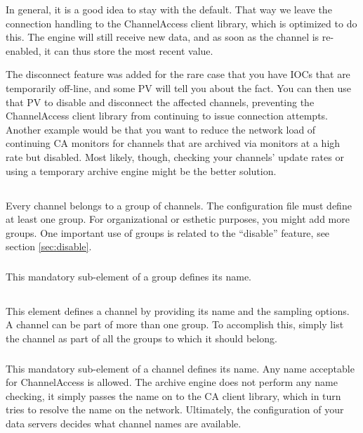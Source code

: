 In general, it is a good idea to stay with the default. That way we
leave the connection handling to the ChannelAccess client library,
which is optimized to do this. The engine will still receive new data,
and as soon as the channel is re-enabled, it can thus store the most
recent value.

The disconnect feature was added for the rare case that you have IOCs
that are temporarily off-line, and some PV will tell you about the
fact. You can then use that PV to disable and disconnect the affected
channels, preventing the ChannelAccess client library from continuing
to issue connection attempts. Another example would be that you want
to reduce the network load of continuing CA monitors for channels
that are archived via monitors at a high rate but disabled. 
Most likely, though, checking your channels' update rates or using a
temporary archive engine might be the better solution.

\subsection{}
Every channel belongs to a group of channels. The configuration file
must define at least one group. For organizational or esthetic
purposes, you might add more groups. One important use of groups is
related to the ``disable'' feature, see section \ref{sec:disable}.

\subsubsection{}
This mandatory sub-element of a group defines its name.

\subsection{}
This element defines a channel by providing its name and the sampling
options. A channel can be part of more than one group. To accomplish
this, simply list the channel as part of all the groups to which it
should belong.

\subsubsection{}
This mandatory sub-element of a channel defines its name. Any name
acceptable for ChannelAccess is allowed. The archive engine does not
perform any name checking, it simply passes the name on to the CA
client library, which in turn tries to resolve the name on the
network.  Ultimately, the configuration of your data servers decides
what channel names are available.

